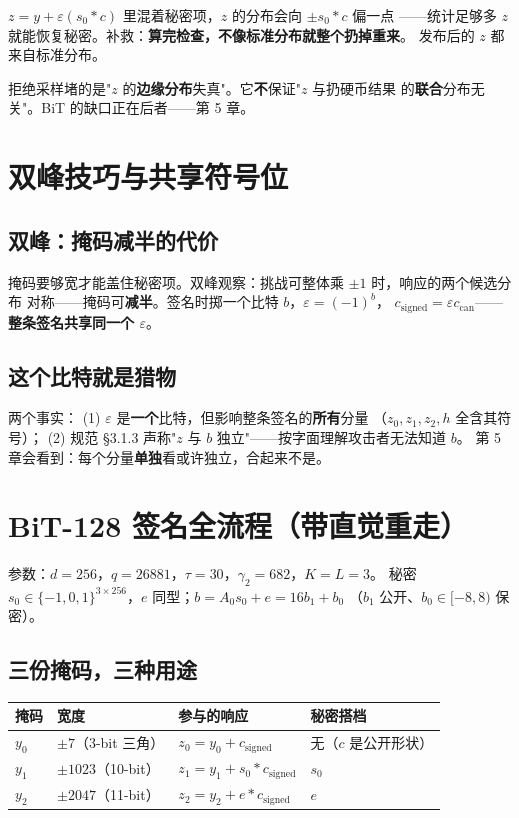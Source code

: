 \documentclass[11pt,a4paper]{ctexart}
\begin{document}
$z = y + \varepsilon(s_0*c)$ 里混着秘密项，$z$ 的分布会向 $\pm s_0*c$ 偏一点
——统计足够多 $z$ 就能恢复秘密。补救：\textbf{算完检查，不像标准分布就整个扔掉重来}。
发布后的 $z$ 都来自标准分布。

\begin{warning}
拒绝采样堵的是"$z$ 的\textbf{边缘分布}失真"。它\textbf{不}保证"$z$ 与扔硬币结果
的\textbf{联合}分布无关"。BiT 的缺口正在后者——第 5 章。
\end{warning}

\section{双峰技巧与共享符号位}

\subsection{双峰：掩码减半的代价}

掩码要够宽才能盖住秘密项。双峰观察：挑战可整体乘 $\pm1$ 时，响应的两个候选分布
对称——掩码可\textbf{减半}。签名时掷一个比特 $b$，$\varepsilon=(-1)^b$，
$c_{\mathrm{signed}} = \varepsilon c_{\mathrm{can}}$——\textbf{整条签名共享同一个 $\varepsilon$}。

\subsection{这个比特就是猎物}

两个事实：
(1) $\varepsilon$ 是\textbf{一个}比特，但影响整条签名的\textbf{所有}分量
（$z_0,z_1,z_2,h$ 全含其符号）；
(2) 规范 §3.1.3 声称"$z$ 与 $b$ 独立"——按字面理解攻击者无法知道 $b$。
第 5 章会看到：每个分量\textbf{单独}看或许独立，合起来不是。

\section{BiT-128 签名全流程（带直觉重走）}

参数：$d=256$，$q=26881$，$\tau=30$，$\gamma_2=682$，$K=L=3$。
秘密 $s_0\in\{-1,0,1\}^{3\times256}$，$e$ 同型；$b = A_0 s_0 + e = 16b_1 + b_0$
（$b_1$ 公开、$b_0\in[-8,8)$ 保密）。

\subsection{三份掩码，三种用途}

\begin{center}
\begin{tabular}{llll}
\toprule
掩码 & 宽度 & 参与的响应 & 秘密搭档 \\
\midrule
$y_0$ & $\pm7$（3-bit 三角） & $z_0 = y_0 + c_{\mathrm{signed}}$ & 无（$c$ 是公开形状）\\
$y_1$ & $\pm1023$（10-bit） & $z_1 = y_1 + s_0*c_{\mathrm{signed}}$ & $s_0$ \\
$y_2$ & $\pm2047$（11-bit） & $z_2 = y_2 + e*c_{\mathrm{signed}}$ & $e$ \\
\bottomrule
\end{tabular}
\end{center}
\end{document}
